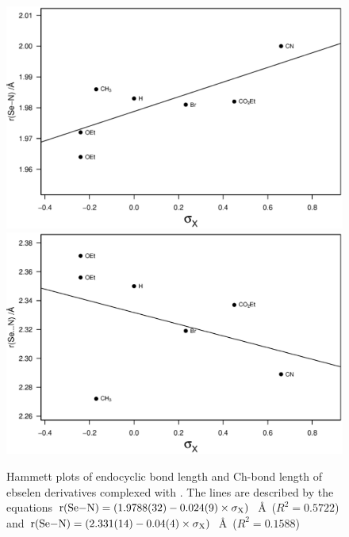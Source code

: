 \begin{refsection}
\begin{figure}
  \centering
  \includegraphics[width=0.9\linewidth]{Figures/hammett-endo-pyrrol.eps}
  \includegraphics[width=0.9\linewidth]{Figures/hammett-pyrrol.eps}
  \caption{Hammett plots of endocyclic  bond length and  Ch-bond length of ebselen derivatives complexed with . The lines are described by the equations $\mathrm{r}(\ce{Se-N}) = (1.9788(32) - 0.024(9) \times \sigma_{\mathrm{X}})$~\AA~($R^2=0.5722$) and $\mathrm{r}(\ce{Se-N}) = (2.331(14) - 0.04(4) \times \sigma_{\mathrm{X}})$~\AA~($R^2=0.1588$)}
  \label{fig:hammett-pyrrol}
\end{figure}


\end{refsection}
